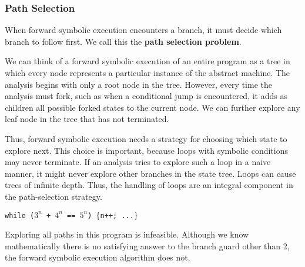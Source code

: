 \subsubsection{Path Selection} 
When forward symbolic execution encounters a branch, it must decide which branch to follow first. We call this the \textbf{path selection problem}.

We can think of a forward symbolic execution of an entire program as a tree in which every node represents a particular instance of the abstract machine. The analysis begins with only a root node in the tree. However, every time the analysis must fork, such as when a conditional jump is encountered, it adds as children all possible forked states to the current node. We can further explore any leaf node in the tree that has not terminated. 

Thus, forward symbolic execution needs a strategy for choosing which state to explore next. This choice is important, because loops with symbolic conditions may never terminate. If an analysis tries to explore such a loop in a naive manner, it might never explore other branches in the state tree. Loops can cause trees of infinite depth. Thus, the handling of loops are an integral component in the path-selection strategy.

\begin{center}\texttt{while ($3^{n}$ + $4^{n}$ == $5^{n}$) $\{$n++; ...$\}$}\end{center}


Exploring all paths in this program is infeasible. Although we know mathematically there is no satisfying answer to the branch guard other than 2, the forward symbolic execution algorithm does not.

